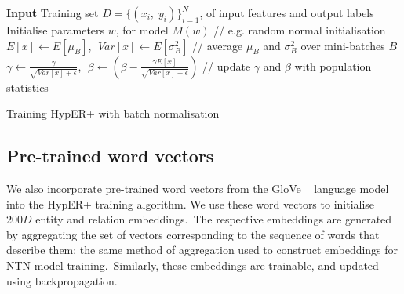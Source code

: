 \begin{algorithm}
	\SetAlgoLined
	\textbf{Input} 
	Training set $ D = \{(x_i, \; y_i)\}_{i=1}^N $, of input features and output labels \\
	Initialise parameters $ w $, for model $ M(w) $ // e.g. random normal initialisation \\
	$ E[x] \gets E[\mu_B] $, $ \; Var[x] \gets E[\sigma_B^2] $ // average $ \mu_B $ and $ \sigma_B^2 $ over mini-batches $ B $ \\
	$ \gamma \gets \frac{\gamma}{\sqrt{Var[x] + \epsilon}} $, $ \; \beta \gets \left(\beta - \frac{\gamma E[x]}{\sqrt{Var[x] + \epsilon}} \right) $ // update $ \gamma $ and $ \beta $ with population statistics
	\caption{Training HypER+ with batch normalisation}
\end{algorithm} 
 
\subsection{Pre-trained word vectors}

We also incorporate pre-trained word vectors from the GloVe \unskip ~\citep{pennington2014glove} language model into the HypER+ training algorithm. We use these word vectors to initialise $ 200D $ entity and relation embeddings.\ The respective embeddings are generated by aggregating the set of vectors corresponding to the sequence of words that describe them; the same method of aggregation used to construct embeddings for NTN model training.\ Similarly, these embeddings are trainable, and updated using backpropagation.  

